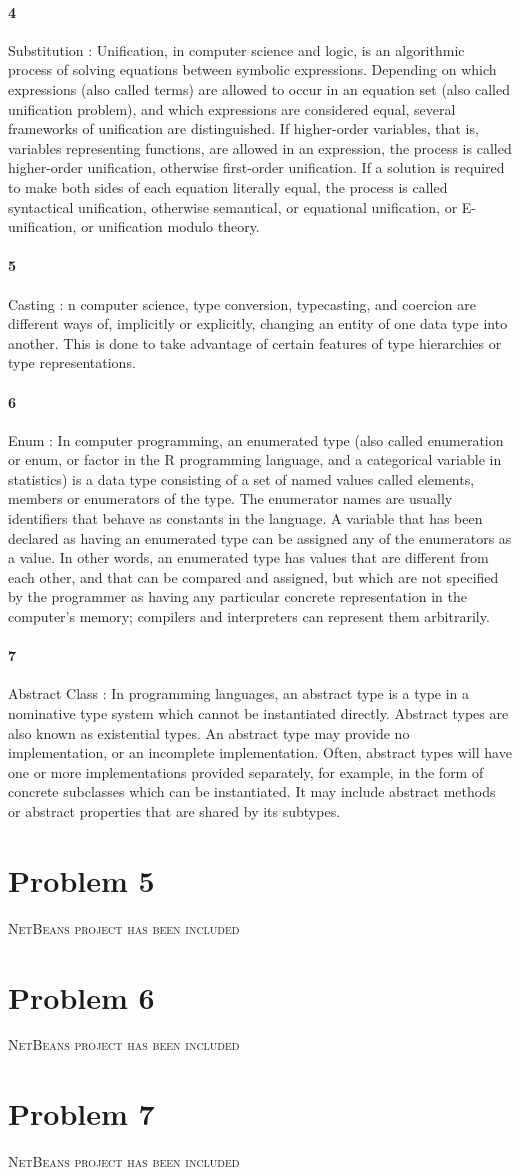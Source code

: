 \documentclass{article}
\begin{document}
\paragraph{4}
Substitution : Unification, in computer science and logic, is an algorithmic process of solving equations between symbolic expressions.
Depending on which expressions (also called terms) are allowed to occur in an equation set (also called unification problem), and which expressions are considered equal, several frameworks of unification are distinguished. If higher-order variables, that is, variables representing functions, are allowed in an expression, the process is called higher-order unification, otherwise first-order unification. If a solution is required to make both sides of each equation literally equal, the process is called syntactical unification, otherwise semantical, or equational unification, or E-unification, or unification modulo theory.
\paragraph{5}
Casting : n computer science, type conversion, typecasting, and coercion are different ways of, implicitly or explicitly, changing an entity of one data type into another. This is done to take advantage of certain features of type hierarchies or type representations.
\paragraph{6}
Enum : In computer programming, an enumerated type (also called enumeration or enum, or factor in the R programming language, and a categorical variable in statistics) is a data type consisting of a set of named values called elements, members or enumerators of the type. The enumerator names are usually identifiers that behave as constants in the language. A variable that has been declared as having an enumerated type can be assigned any of the enumerators as a value. In other words, an enumerated type has values that are different from each other, and that can be compared and assigned, but which are not specified by the programmer as having any particular concrete representation in the computer's memory; compilers and interpreters can represent them arbitrarily.
\paragraph{7}
Abstract Class : In programming languages, an abstract type is a type in a nominative type system which cannot be instantiated directly. Abstract types are also known as existential types. An abstract type may provide no implementation, or an incomplete implementation. Often, abstract types will have one or more implementations provided separately, for example, in the form of concrete subclasses which can be instantiated. It may include abstract methods or abstract properties that are shared by its subtypes.
\section{Problem 5}
\textsc{NetBeans project has been included}
\section{Problem 6}
\textsc{NetBeans project has been included}
\section{Problem 7}
\textsc{NetBeans project has been included}
\end{document}
